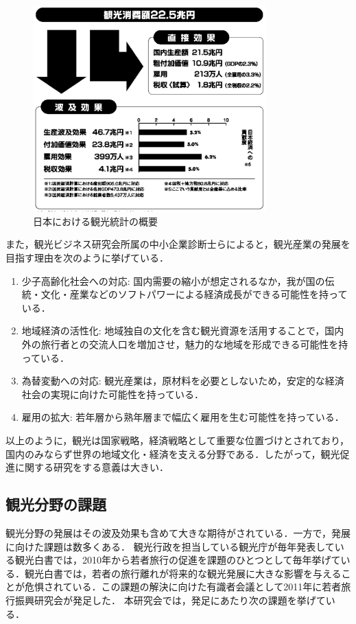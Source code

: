 \documentclass{jsarticle}
\begin{document}
\begin{figure}[!ht]
\begin{center}
\includegraphics[width=9.0cm]{./image/tourism_kibo.png}
\caption{日本における観光統計の概要\cite{tourism_stat}}
\label{tourism_kibo}
\end{center}
\end{figure}

また，観光ビジネス研究会所属の中小企業診断士らによると，観光産業の発展を目指す理由を次のように挙げている\cite{tourism_future}．

\begin{enumerate}
\item 少子高齢化社会への対応: 国内需要の縮小が想定されるなか，我が国の伝統・文化・産業などのソフトパワーによる経済成長ができる可能性を持っている．
\item 地域経済の活性化: 地域独自の文化を含む観光資源を活用することで，国内外の旅行者との交流人口を増加させ，魅力的な地域を形成できる可能性を持っている．
\item 為替変動への対応: 観光産業は，原材料を必要としないため，安定的な経済社会の実現に向けた可能性を持っている．
\item 雇用の拡大: 若年層から熟年層まで幅広く雇用を生む可能性を持っている．
\end{enumerate}


以上のように，観光は国家戦略，経済戦略として重要な位置づけとされており，国内のみならず世界の地域文化・経済を支える分野である．したがって，観光促進に関する研究をする意義は大きい．

\subsection{観光分野の課題}

観光分野の発展はその波及効果も含めて大きな期待がされている．一方で，発展に向けた課題は数多くある．
観光行政を担当している観光庁が毎年発表している観光白書では，2010年から若者旅行の促進を課題のひとつとして毎年挙げている\cite{kanko_hakusho_2009}\cite{kanko_hakusho_2010}\cite{kanko_hakusho_2011}\cite{kanko_hakusho_2012}\cite{kanko_hakusho_2013}\cite{kanko_hakusho_2014}．観光白書では，若者の旅行離れが将来的な観光発展に大きな影響を与えることが危惧されている．この課題の解決に向けた有識者会議として2011年に若者旅行振興研究会が発足した．
本研究会では，発足にあたり次の課題を挙げている\cite{wakamono_shinko}．
\end{document}
